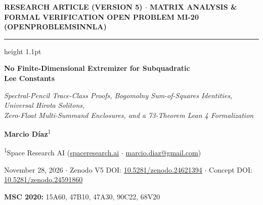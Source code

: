 \documentclass[10pt,letterpaper]{article}
\begin{document}
\thispagestyle{firstpage}

{\sffamily\footnotesize\bfseries\color{accentblue}RESEARCH ARTICLE (VERSION 5) $\cdot$ MATRIX ANALYSIS \& FORMAL VERIFICATION \hfill OPEN PROBLEM MI-20 (OPENPROBLEMSINNLA)}\par
\vspace{2pt}
{\color{ink}\hrule height 1.1pt}
\vspace{10pt}

\begin{center}
  {\LARGE\bfseries\color{ink} No Finite-Dimensional Extremizer for Subquadratic\\[3pt] Lee Constants}\par
  \vspace{5.5pt}
  {\large\itshape\color{muted} Spectral-Pencil Trace-Class Proofs, Bogomolny Sum-of-Squares Identities, Universal Hirota Solitons,\\[1pt] Zero-Float Multi-Summand Enclosures, and a 73-Theorem Lean 4 Formalization}\par
  \vspace{7.5pt}
  {\normalsize\bfseries Marcio D\'{i}az}\textsuperscript{1}\par
  \vspace{1.5pt}
  {\small\color{muted}\textsuperscript{1}Space Research AI (\href{https://spaceresearch.ai}{spaceresearch.ai} $\cdot$ \href{mailto:marcio.diaz@gmail.com}{marcio.diaz@gmail.com})}\par
  \vspace{1pt}
  {\footnotesize\color{muted}November 28, 2026 \quad $\cdot$ \quad Zenodo V5 DOI: \href{https://doi.org/10.5281/zenodo.24621394}{10.5281/zenodo.24621394} \quad $\cdot$ \quad Concept DOI: \href{https://doi.org/10.5281/zenodo.24591860}{10.5281/zenodo.24591860}}\par
  {\footnotesize\color{muted}\textbf{MSC 2020:} 15A60, 47B10, 47A30, 90C22, 68V20}
\end{center}
\vspace{2pt}
\end{document}
